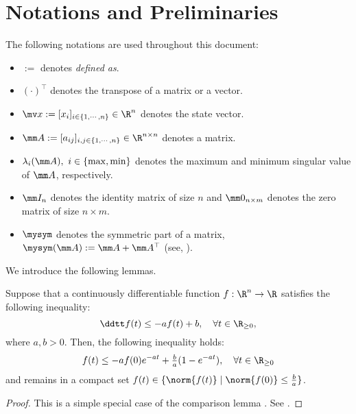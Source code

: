 
\section{Notations and Preliminaries}

The following notations are used throughout this document:
\begin{itemize}
    \item $:=$ denotes \textit{defined as}.
    \item $(\cdot)^\top$ denotes the transpose of a matrix or a vector.
    \item $\bdx:=[x_i]_{i\in\{1,\cdots,n\}}\in\R^n$ denotes the state vector.
    \item $\mm A:=[a_{ij}]_{i,j\in\{1,\cdots,n\}}\in\R^{n\times n}$ denotes a matrix.
    \item $\lambda_{i}(\mm A),\ i\in\{\max,\min\}$ denotes the maximum and minimum singular value of $\mm A$, respectively.
    \item $\mm I_n$ denotes the identity matrix of size $n$ and $\mm 0_{n\times m}$ denotes the zero matrix of size $n\times m$.
    \item $\mysym$ denotes the symmetric part of a matrix, \ie $\mysym(\mm A):=\mm A+\mm A^\top$ (see, \cite{Tsukamoto:2021ac}).
\end{itemize}

We introduce the following lemmas.

\begin{lem}
	Suppose that a continuously differentiable function $f:\R^n\to\R$ satisfies the following inequality:
	\begin{equation}
		\ddtt f(t)\le -a f(t)+ b, \quad \forall t\in\R_{\ge 0}
		,
	\end{equation}
	where $a,b>0$.
	Then, the following inequality holds:
	\begin{equation}
		f(t)\le -af(0)e^{-at} + \tfrac{b}{a}(1-e^{-at}), \quad \forall t\in\R_{\ge 0}
	\end{equation}
	and remains in a compact set $f(t)\in\{\norm{f(t)} \mid \norm{f(0)}\le \tfrac{b}{a}\}$.
	\label{lem:comparison}
\end{lem}

\begin{proof}
	This is a simple special case of the comparison lemma \cite[pp. 102-103]{Khalil:2002aa}.
	See \cite[pp. 659-660]{Khalil:2002aa}.
\end{proof}